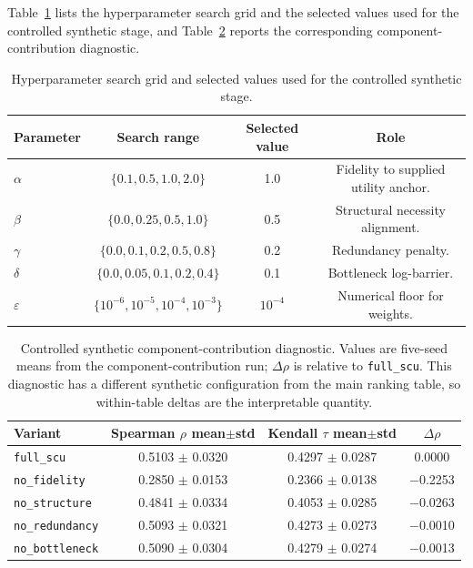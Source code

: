 \documentclass[a4paper,fleqn]{cas-sc}
\begin{document}
Table~\ref{tab:supp-hyperparameters} lists the hyperparameter search grid and the selected values used for the controlled synthetic stage, and Table~\ref{tab:supp-ablation} reports the corresponding component-contribution diagnostic.

\begin{table}[ht]
\caption{Hyperparameter search grid and selected values used for the controlled synthetic stage.}
\label{tab:supp-hyperparameters}
\centering
\small
\begin{tabular}{lccc}
\toprule
\textbf{Parameter} & \textbf{Search range} & \textbf{Selected value} & \textbf{Role} \\
\midrule
$\alpha$ & $\{0.1,0.5,1.0,2.0\}$ & 1.0 & Fidelity to supplied utility anchor. \\
$\beta$ & $\{0.0,0.25,0.5,1.0\}$ & 0.5 & Structural necessity alignment. \\
$\gamma$ & $\{0.0,0.1,0.2,0.5,0.8\}$ & 0.2 & Redundancy penalty. \\
$\delta$ & $\{0.0,0.05,0.1,0.2,0.4\}$ & 0.1 & Bottleneck log-barrier. \\
$\varepsilon$ & $\{10^{-6},10^{-5},10^{-4},10^{-3}\}$ & $10^{-4}$ & Numerical floor for weights. \\
\bottomrule
\end{tabular}
\end{table}

\begin{table}[ht]
\caption{Controlled synthetic component-contribution diagnostic. Values are five-seed means from the component-contribution run; $\Delta\rho$ is relative to \texttt{full\_scu}. This diagnostic has a different synthetic configuration from the main ranking table, so within-table deltas are the interpretable quantity.}
\label{tab:supp-ablation}
\centering
\small
\begin{tabular}{lccc}
\toprule
\textbf{Variant} & \textbf{Spearman $\rho$ mean$\pm$std} & \textbf{Kendall $\tau$ mean$\pm$std} & \textbf{$\Delta\rho$} \\
\midrule
\texttt{full\_scu} & 0.5103 $\pm$ 0.0320 & 0.4297 $\pm$ 0.0287 & 0.0000 \\
\texttt{no\_fidelity} & 0.2850 $\pm$ 0.0153 & 0.2366 $\pm$ 0.0138 & $-$0.2253 \\
\texttt{no\_structure} & 0.4841 $\pm$ 0.0334 & 0.4053 $\pm$ 0.0285 & $-$0.0263 \\
\texttt{no\_redundancy} & 0.5093 $\pm$ 0.0321 & 0.4273 $\pm$ 0.0273 & $-$0.0010 \\
\texttt{no\_bottleneck} & 0.5090 $\pm$ 0.0304 & 0.4279 $\pm$ 0.0274 & $-$0.0013 \\
\bottomrule
\end{tabular}
\end{table}
\end{document}
